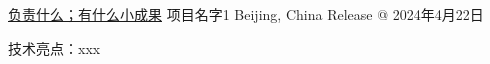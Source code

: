 

\begin{cventries}

  \cventry
    {\underline{负责什么；有什么小成果}} %
    {项目名字1} %
    {Beijing, China} %
    {Release @ 2024年4月22日} %
    {
      \begin{cvitems} %
        \item {技术亮点：xxx}
      \end{cvitems}
    }



    
\end{cventries}
